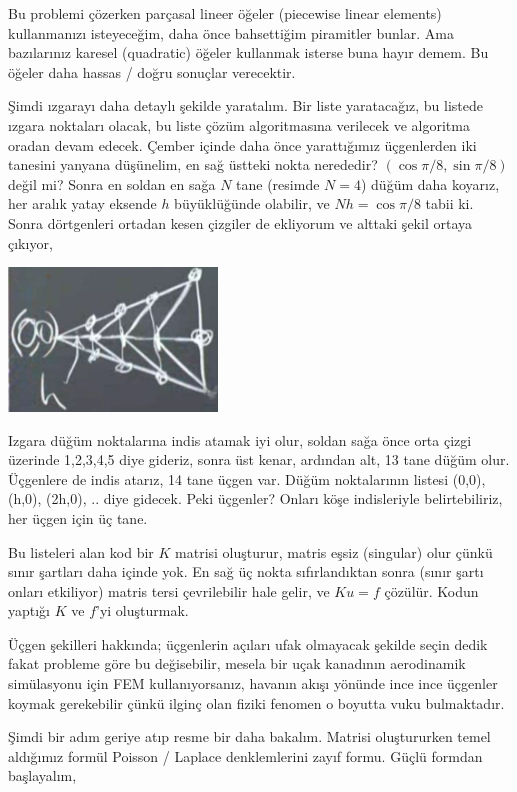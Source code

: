 \documentclass[12pt,fleqn]{article}\usepackage{../../common}
\begin{document}
Bu problemi çözerken parçasal lineer öğeler (piecewise linear elements)
kullanmanızı isteyeceğim, daha önce bahsettiğim piramitler bunlar. Ama
bazılarınız karesel (quadratic) öğeler kullanmak isterse buna hayır demem.
Bu öğeler daha hassas / doğru sonuçlar verecektir. 

Şimdi ızgarayı daha detaylı şekilde yaratalım. Bir liste yaratacağız, bu listede
ızgara noktaları olacak, bu liste çözüm algoritmasına verilecek ve algoritma
oradan devam edecek. Çember içinde daha önce yarattığımız üçgenlerden iki
tanesini yanyana düşünelim, en sağ üstteki nokta nerededir? $(\cos \pi/8, \sin \pi/8)$ 
değil mi? Sonra en soldan en sağa $N$ tane (resimde $N=4$) düğüm daha koyarız, 
her aralık yatay eksende $h$ büyüklüğünde olabilir, ve $N h = \cos\pi/8$ tabii ki. 
Sonra dörtgenleri ortadan kesen çizgiler de ekliyorum ve alttaki şekil ortaya çıkıyor,

\includegraphics[width=15em]{compscieng_1_27_03.png}

Izgara düğüm noktalarına indis atamak iyi olur, soldan sağa önce orta çizgi
üzerinde 1,2,3,4,5 diye gideriz, sonra üst kenar, ardından alt, 13 tane düğüm
olur. Üçgenlere de indis atarız, 14 tane üçgen var. Düğüm noktalarının listesi
(0,0), (h,0), (2h,0), .. diye gidecek. Peki üçgenler? Onları köşe indisleriyle
belirtebiliriz, her üçgen için üç tane.

Bu listeleri alan kod bir $K$ matrisi oluşturur, matris eşsiz (singular) olur
çünkü sınır şartları daha içinde yok. En sağ üç nokta sıfırlandıktan sonra
(sınır şartı onları etkiliyor) matris tersi çevrilebilir hale gelir, ve $Ku = f$
çözülür. Kodun yaptığı $K$ ve $f$'yi oluşturmak.

Üçgen şekilleri hakkında; üçgenlerin açıları ufak olmayacak şekilde seçin dedik
fakat probleme göre bu değisebilir, mesela bir uçak kanadının aerodinamik
simülasyonu için FEM kullanıyorsanız, havanın akışı yönünde ince ince üçgenler
koymak gerekebilir çünkü ilginç olan fiziki fenomen o boyutta vuku bulmaktadır.

Şimdi bir adım geriye atıp resme bir daha bakalım. Matrisi oluştururken temel
aldığımız formül Poisson / Laplace denklemlerini zayıf formu. Güçlü formdan
başlayalım,
\end{document}
